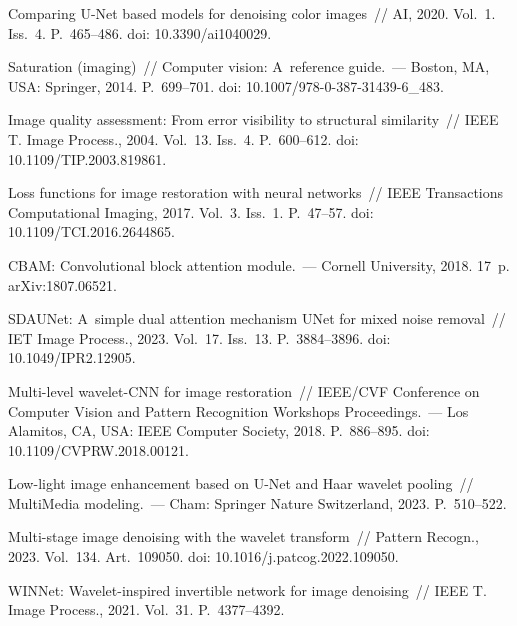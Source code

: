 \begin{multicols}{2}
{{\begin{thebibliography}{99}
     Comparing U-Net based  models
    for denoising color images~// AI, 2020. Vol.~1. Iss.~4. P.~465--486. doi:  10.3390/ai1040029.

     Saturation (imaging)~// Computer vision: A~reference
guide.~--- Boston, MA, USA: Springer, 2014. P.~699--701. doi: 10.1007/978-0-387-31439-6\_483.
    
    Image quality assessment: From error visibility to structural similarity~//
    IEEE T. Image Process., 2004. Vol.~13. Iss.~4. P.~600--612. 
doi: 10.1109/TIP.2003.819861.
    
    Loss functions for image restoration with neural networks~// IEEE
    Transactions Computational Imaging, 2017. Vol.~3. Iss.~1. P.~47--57. 
doi: 10.1109/TCI.2016.2644865.
    
    CBAM: Convolutional block attention module.~--- Cornell University, 2018. 
17~p.  arXiv:1807.06521. 
    
    SDAUNet: A~simple dual attention mechanism UNet for mixed noise removal~// 
IET Image Process., 2023. Vol.~17. Iss.~13. P.~3884--3896. doi: 
10.1049/IPR2.12905.
    
    Multi-level wavelet-CNN for image restoration~// IEEE/CVF Conference 
on Computer Vision and Pattern Recognition Workshops Proceedings.~--- Los Alamitos, 
CA, USA: IEEE Computer Society, 2018. P.~886--895. doi: 
10.1109/CVPRW.2018.00121.
    
     Low-light image 
enhancement based on U-Net and Haar wavelet pooling~//  MultiMedia modeling.~--- Cham: Springer Nature Switzerland, 2023. P.~510--522.
 
    Multi-stage image denoising with the wavelet transform~// Pattern
    Recogn., 2023. Vol.~134. Art.~109050. doi: 
10.1016/j.patcog.2022.109050.
  
     WINNet: Wavelet-inspired     invertible network for image denoising~//
     IEEE T.  Image Process., 2021. Vol.~31. P.~4377--4392.
    

\end{thebibliography}}}
\end{multicols}
